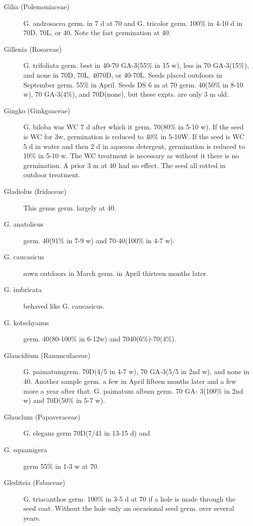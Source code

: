 \begin{description}
\item[Gilia (Polemoniaceae)] G. androsacea germ. in 7 d at 70 and G. tricolor
germ. 100\% in 4-10 d in 70D, 70L, or 40. Note the fast germination at 40.

\item[Gillenia (Rosaceae)] G. trifoliata germ. best in 40-70 GA-3(55\% in 15 w),
less in 70 GA-3(15\%), and none in 70D, 70L, 4070D, or 40-70L. Seeds placed
outdoors in September germ. 55\% in April. Seeds DS 6 m at 70 germ. 40(50\% in 8-10
w), 70 GA-3(4\%), and 70D(none), but these expts. are only 3 m old.

\item[Gingko (Ginkgoaceae)] G. biloba was WC 7 d after which it germ. 70(80\%
in 5-10 w). If the seed is WC for 3w, germination is reduced to 40\% in 5-10W. If the
seed is WC 5 d in water and then 2 d in aqueous detergent, germination is reduced to
10\% in 5-10 w. The WC treatment is necessary as without it there is no germination. A
prior 3 m at 40 had no effect. The seed all rotted in outdoor treatment.

\item[Gladiolus (Iridaceae)] This genus germ. largely at 40.
\item[G. anatolicus] germ. 40(91\% in 7-9 w) and 70-40(100\% in 4-7 w).
\item[G. caucasicus] sown outdoors in March germ. in April thirteen months later.
\item[G. imbricata] behaved like G. caucasicus.
\item[G. kotschyanus] germ. 40(80-100\% in 6-12w) and 7040(6\%)-70(4\%).

\item[Glaucidium (Ranunculaceae)] G. paimatumgerm. 70D(4/5 in 4-7 w), 70
GA-3(5/5 in 2nd w), and none in 40. Another sample germ. a few in April fifteen
months later and a few more a year after that. G. paimatum album germ. 70 GA-
3(100\% in 2nd w) and 70D(50\% in 5-7 w).

\item[Glauclum (Papaveraceae)] G. elegans germ 70D(7/41 in 13-15 d) and
\item[G. squamigera] germ 55\% in 1-3 w at 70.

\item[Gleditsia (Fabaceae)] G. triacanthos germ. 100\% in 3-5 d at 70 if a hole is
made through the seed coat. Without the hole only an occasional seed germ. over
several years.


\end{description}
